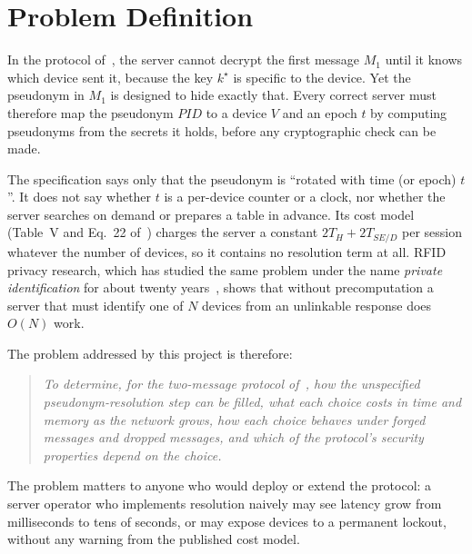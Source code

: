 \section{Problem Definition}
In the protocol of~\cite{base}, the server cannot decrypt the first message $M_1$ until it knows which device sent it, because the key $k^\star$ is specific to the device. Yet the pseudonym in $M_1$ is designed to hide exactly that. Every correct server must therefore map the pseudonym $PID$ to a device $V$ and an epoch $t$ by computing pseudonyms from the secrets it holds, before any cryptographic check can be made.

The specification says only that the pseudonym is ``rotated with time (or epoch) $t$''. It does not say whether $t$ is a per-device counter or a clock, nor whether the server searches on demand or prepares a table in advance. Its cost model (Table~V and Eq.~22 of~\cite{base}) charges the server a constant $2T_H+2T_{SE/D}$ per session whatever the number of devices, so it contains no resolution term at all. RFID privacy research, which has studied the same problem under the name \emph{private identification} for about twenty years~\cite{weis,ohkubo,molnar,avoine05,ado05,tsudik}, shows that without precomputation a server that must identify one of $N$ devices from an unlinkable response does $O(N)$ work.

The problem addressed by this project is therefore:
\begin{quote}
\emph{To determine, for the two-message protocol of~\cite{base}, how the unspecified pseudonym-resolution step can be filled, what each choice costs in time and memory as the network grows, how each choice behaves under forged messages and dropped messages, and which of the protocol's security properties depend on the choice.}
\end{quote}
The problem matters to anyone who would deploy or extend the protocol: a server operator who implements resolution naively may see latency grow from milliseconds to tens of seconds, or may expose devices to a permanent lockout, without any warning from the published cost model.

